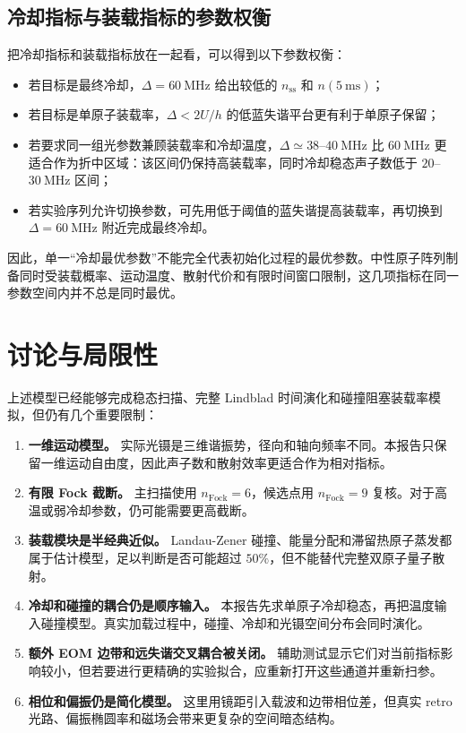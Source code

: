 \documentclass[UTF8,a4paper,12pt]{ctexart}
\begin{document}
\subsection{冷却指标与装载指标的参数权衡}

把冷却指标和装载指标放在一起看，可以得到以下参数权衡：
\begin{itemize}
  \item 若目标是最终冷却，$\Delta=60~\mathrm{MHz}$ 给出较低的 $n_{\mathrm{ss}}$ 和 $n(5~\mathrm{ms})$；
  \item 若目标是单原子装载率，$\Delta<2U/h$ 的低蓝失谐平台更有利于单原子保留；
  \item 若要求同一组光参数兼顾装载率和冷却温度，$\Delta\simeq38$--$40~\mathrm{MHz}$ 比 $60~\mathrm{MHz}$ 更适合作为折中区域：该区间仍保持高装载率，同时冷却稳态声子数低于 $20$--$30~\mathrm{MHz}$ 区间；
  \item 若实验序列允许切换参数，可先用低于阈值的蓝失谐提高装载率，再切换到 $\Delta=60~\mathrm{MHz}$ 附近完成最终冷却。
\end{itemize}

因此，单一“冷却最优参数”不能完全代表初始化过程的最优参数。中性原子阵列制备同时受装载概率、运动温度、散射代价和有限时间窗口限制，这几项指标在同一参数空间内并不总是同时最优。

\section{讨论与局限性}

上述模型已经能够完成稳态扫描、完整 Lindblad 时间演化和碰撞阻塞装载率模拟，但仍有几个重要限制：

\begin{enumerate}
  \item \textbf{一维运动模型。} 实际光镊是三维谐振势，径向和轴向频率不同。本报告只保留一维运动自由度，因此声子数和散射效率更适合作为相对指标。
  \item \textbf{有限 Fock 截断。} 主扫描使用 $n_{\mathrm{Fock}}=6$，候选点用 $n_{\mathrm{Fock}}=9$ 复核。对于高温或弱冷却参数，仍可能需要更高截断。
  \item \textbf{装载模块是半经典近似。} Landau-Zener 碰撞、能量分配和滞留热原子蒸发都属于估计模型，足以判断是否可能超过 $50\%$，但不能替代完整双原子量子散射。
  \item \textbf{冷却和碰撞的耦合仍是顺序输入。} 本报告先求单原子冷却稳态，再把温度输入碰撞模型。真实加载过程中，碰撞、冷却和光镊空间分布会同时演化。
  \item \textbf{额外 EOM 边带和远失谐交叉耦合被关闭。} 辅助测试显示它们对当前指标影响较小，但若要进行更精确的实验拟合，应重新打开这些通道并重新扫参。
  \item \textbf{相位和偏振仍是简化模型。} 这里用镜距引入载波和边带相位差，但真实 retro 光路、偏振椭圆率和磁场会带来更复杂的空间暗态结构。
\end{enumerate}
\end{document}

